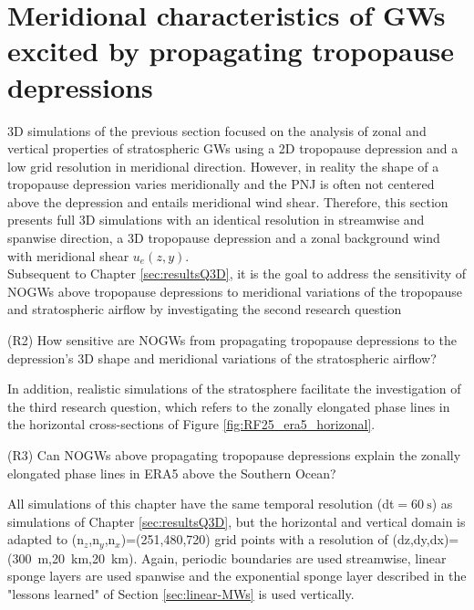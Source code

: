 \chapter{Meridional characteristics of GWs excited by propagating tropopause depressions}
\label{sec:results3D}
3D simulations of the previous section focused on the analysis of zonal and vertical properties of stratospheric GWs using a 2D tropopause depression and a low grid resolution in meridional direction. However, in reality the shape of a tropopause depression varies meridionally and the PNJ is often not centered above the depression and entails meridional wind shear. Therefore, this section presents full 3D simulations with an identical resolution in streamwise and spanwise direction, a 3D tropopause depression and a zonal background wind with meridional shear $u_e(z,y)$. \\
Subsequent to Chapter \ref{sec:resultsQ3D}, it is the goal to address the sensitivity of NOGWs above tropopause depressions to meridional variations of the tropopause and stratospheric airflow by investigating the second research question
\begin{tcolorbox}[]
    (R2) How sensitive are NOGWs from propagating tropopause depressions to the depression's 3D shape and meridional variations of the stratospheric airflow?
\end{tcolorbox}
In addition, realistic simulations of the stratosphere facilitate the investigation of the third research question, which refers to the zonally elongated phase lines in the horizontal cross-sections of Figure \ref{fig:RF25_era5_horizonal}.
\begin{tcolorbox}[]
    (R3) Can NOGWs above propagating tropopause depressions explain the zonally elongated phase lines in ERA5 above the Southern Ocean?
\end{tcolorbox}
All simulations of this chapter have the same temporal resolution (dt$=\SI{60}{\second}$) as simulations of Chapter \ref{sec:resultsQ3D}, but the horizontal and vertical domain is adapted to (n$_z$,n$_y$,n$_x$)=(251,480,720) grid points with a resolution of (dz,dy,dx)=(\SI{300}{\meter},\SI{20}{\kilo\meter},\SI{20}{\kilo\meter}). Again, periodic boundaries are used streamwise, linear sponge layers are used spanwise and the exponential sponge layer described in the "lessons learned" of Section \ref{sec:linear-MWs} is used vertically.

